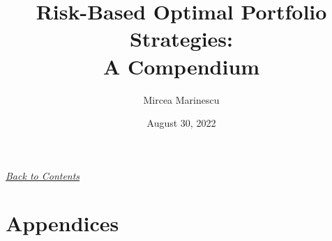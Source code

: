 \documentclass[10pt]{article}
\numberwithin{equation}{section}
\newcommand\BackToContents{%
\bigskip
\noindent \hyperref[content]{\it Back to Contents}
}%
\begin{document}
\bigskip

\title{Risk-Based Optimal Portfolio Strategies: \\
       A Compendium}

\author{Mircea Marinescu}

\date{August 30, 2022}

\maketitle

\begin{abstract}

\end{abstract}

\break
\tableofcontents
\label{content}
\break









\pagebreak

\BackToContents

\pagebreak
\appendix
{}
\section*{Appendices}




\end{document}

